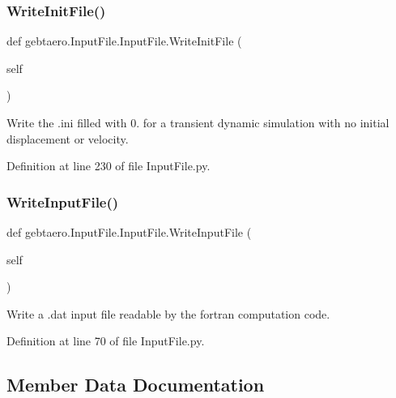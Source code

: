 \subsubsection{\texorpdfstring{Write\+Init\+File()}{WriteInitFile()}}
{\footnotesize\ttfamily def gebtaero.\+Input\+File.\+Input\+File.\+Write\+Init\+File (\begin{DoxyParamCaption}\item[{}]{self }\end{DoxyParamCaption})}



Write the .ini filled with 0. for a transient dynamic simulation with no initial displacement or velocity. 



Definition at line 230 of file Input\+File.\+py.

\mbox{\label{classgebtaero_1_1_input_file_1_1_input_file_aff90830e65ba0e25b330c595a94a7a82}} 
\subsubsection{\texorpdfstring{Write\+Input\+File()}{WriteInputFile()}}
{\footnotesize\ttfamily def gebtaero.\+Input\+File.\+Input\+File.\+Write\+Input\+File (\begin{DoxyParamCaption}\item[{}]{self }\end{DoxyParamCaption})}



Write a .dat input file readable by the fortran computation code. 



Definition at line 70 of file Input\+File.\+py.



\subsection{Member Data Documentation}
\mbox{\label{classgebtaero_1_1_input_file_1_1_input_file_a17d270c516291f04138f9949ae9e6dd3}} 
